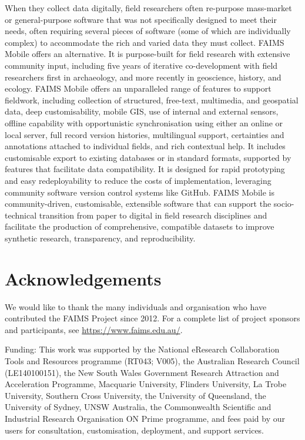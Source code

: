 \documentclass[preprint,12pt, a4paper]{elsarticle}
\begin{document}
When they collect data digitally, field researchers often re-purpose mass-market or general-purpose software that was not specifically designed to meet their needs, often requiring several pieces of software (some of which are individually complex) to accommodate the rich and varied data they must collect. FAIMS Mobile offers an alternative. It is purpose-built for field research with extensive community input, including five years of iterative co-development with field researchers first in archaeology, and more recently in geoscience, history, and ecology. FAIMS Mobile offers an unparalleled range of features to support fieldwork, including collection of structured, free-text, multimedia, and geospatial data, deep customisability, mobile GIS, use of internal and external sensors, offline capability with opportunistic synchronisation using either an online or local server, full record version histories, multilingual support, certainties and annotations attached to individual fields, and rich contextual help. It includes customisable export to existing databases or in standard formats, supported by features that facilitate data compatibility. It is designed for rapid prototyping and easy redeployability to reduce the costs of implementation, leveraging community software version control systems like GitHub.  FAIMS Mobile is community-driven, customisable, extensible software that can support the socio-technical transition from paper to digital in field research disciplines and facilitate the production of comprehensive, compatible datasets to improve synthetic research, transparency, and reproducibility.  


\appendix


\section*{Acknowledgements}


We would like to thank the many individuals and organisation who have contributed the FAIMS Project since 2012. For a complete list of project sponsors and participants, see \url{https://www.faims.edu.au/}.

Funding: 	This work was supported by the National eResearch Collaboration Tools and Resources programme (RT043; V005), the Australian Research Council (LE140100151), the New South Wales Government Research Attraction and Acceleration Programme, Macquarie University, Flinders University, La Trobe University, Southern Cross University, the University of Queensland, the University of Sydney, UNSW Australia, the Commonwealth Scientific and Industrial Research Organisation ON Prime programme, and fees paid by our users for consultation, customisation, deployment, and support services.
\end{document}
